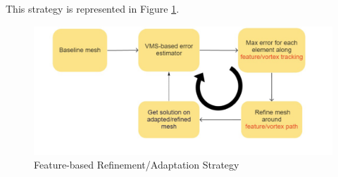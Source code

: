 
This strategy is represented in Figure \ref{fig:feature_based_strat}.

\begin{figure}[H]
	\centering
	\includegraphics[width=1\textwidth]{figures/adapt_strat/feature_based.png}
	\caption{Feature-based Refinement/Adaptation Strategy}
	\label{fig:feature_based_strat}
\end{figure}


